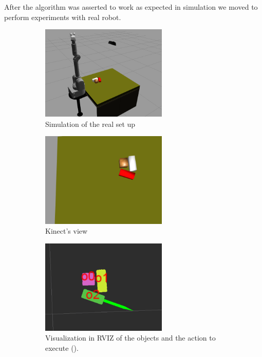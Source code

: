 
After the algorithm was asserted to work as expected in simulation we moved to perform experiments with real robot. 

\begin{figure}
\centering
\begin{subfigure}[h]{0.45\textwidth}
\centering
\includegraphics[width=6cm]{Img/simulation/setup_sim.png}
\caption{Simulation of the real set up}\label{fig:sim_setup}
\end{subfigure}
\begin{subfigure}[h]{0.45\textwidth}
\centering
\includegraphics[width=6cm]{Img/simulation/image.png}
\caption{Kinect's view}
\label{fig:sim_kinect}
\end{subfigure}
\begin{subfigure}[h]{0.45\textwidth}
\centering
\includegraphics[width=6cm]{Img/simulation/action1.png}
\caption{Visualization in RVIZ of the objects and the action to execute ().}
\label{fig:sim_rviz}
\end{subfigure}
\begin{subfigure}[h]{0.45\textwidth}

\end{subfigure}
\end{figure}
